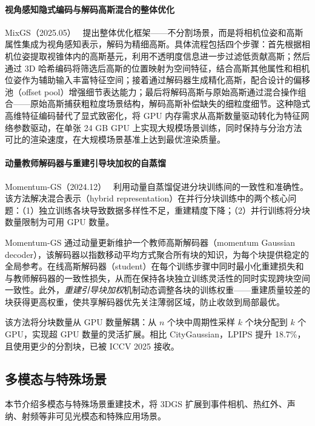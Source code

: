 \paragraph{视角感知隐式编码与解码高斯混合的整体优化}

MixGS（2025.05）~\cite{2505_23280} 提出整体优化框架——不分割场景，而是将相机位姿和高斯属性集成为视角感知表示，解码为精细高斯。具体流程包括四个步骤：首先根据相机位姿提取视锥体内的高斯基元，利用不透明度信息进一步过滤低贡献高斯；然后通过 3D 哈希编码将筛选后高斯的位置映射为空间特征，结合高斯其他属性和相机位姿作为辅助输入丰富特征空间；接着通过解码器生成精化高斯，配合设计的偏移池（offset pool）增强细节表达能力；最后将解码高斯与原始高斯通过混合操作组合——原始高斯捕获粗粒度场景结构，解码高斯补偿缺失的细粒度细节。这种隐式高维特征编码替代了显式致密化，将 GPU 内存需求从高斯数量驱动转化为特征网络参数驱动，在单张 24 GB GPU 上实现大规模场景训练，同时保持与分治方法可比的渲染速度，在大规模场景基准上达到最优渲染质量。

\paragraph{动量教师解码器与重建引导块加权的自蒸馏}

Momentum-GS（2024.12）~\cite{2412_04887} 利用动量自蒸馏促进分块训练间的一致性和准确性。该方法解决混合表示（hybrid representation）在并行分块训练中的两个核心问题：（1）独立训练各块导致数据多样性不足，重建精度下降；（2）并行训练将分块数量限制为可用 GPU 数量。

Momentum-GS 通过动量更新维护一个教师高斯解码器（momentum Gaussian decoder），该解码器以指数移动平均方式聚合所有块的知识，为每个块提供稳定的全局参考。在线高斯解码器（student）在每个训练步骤中同时最小化重建损失和与教师解码器的一致性损失，从而在保持各块独立训练灵活性的同时实现跨块空间一致性。此外，\emph{重建引导块加权}机制动态调整各块的训练权重——重建质量较差的块获得更高权重，使共享解码器优先关注薄弱区域，防止收敛到局部最优。

该方法将分块数量从 GPU 数量解耦：从 $n$ 个块中周期性采样 $k$ 个块分配到 $k$ 个 GPU，实现超 GPU 数量的灵活扩展。相比 CityGaussian，LPIPS 提升 18.7\%，且使用更少的分割块，已被 ICCV 2025 接收。

\subsection{多模态与特殊场景}
\label{ss:14_10}

本节介绍多模态与特殊场景重建技术，将 3DGS 扩展到事件相机、热红外、声纳、射频等非可见光模态和特殊应用场景。

